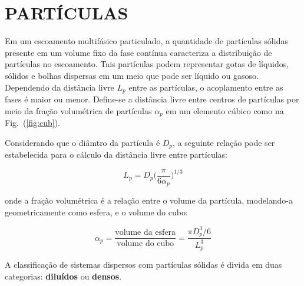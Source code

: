 \typeout{ ====================================================================}
\typeout{ ====================================================================}

\section{PARTÍCULAS}

Em um escoamento multifásico particulado, a quantidade de partículas
sólidas presente em um volume fixo da fase contínua caracteriza a
distribuição de partículas no escoamento. Tais partículas podem
representar gotas de líquidos, sólidos e bolhas dispersas em um meio que
pode ser líquido ou gasoso. Dependendo da distância livre $L_p$ entre as
partículas, o acoplamento entre as fases é maior ou menor. Define-se a
distância livre entre centros de partículas por meio da fração
volumétrica de partículas $\alpha_p$ em um elemento cúbico como na
Fig.~(\ref{fig:cub}).


Considerando que o diâmtro da partícula é $D_p$, a seguinte relação pode
ser estabelecida para o cálculo da distância livre entre partículas:

\begin{equation}
	L_p = D_p \bigg( \frac{\pi}{6 \alpha_p} \bigg)^{1/3}
\end{equation}

\noindent onde a fração volumétrica é a relação entre o volume da
partícula, modelando-a geometricamente como esfera, e o volume do cubo:

\begin{equation}
	\alpha_p 
	= 
	\frac{\text{volume da esfera}}{\text{volume do cubo}}
	=
	\frac{\pi D_p^3/6}{L_p^3}
\end{equation}

A classificação de sistemas dispersos com partículas sólidas é divida em
duas categorias: \textbf{diluídos} ou \textbf{densos}.

